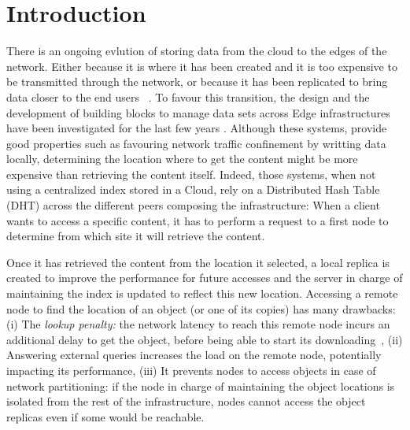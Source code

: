 
\section{Introduction}

There is an ongoing evlution of storing data from the cloud to the
edges of the network. Either because it is where it has been created
and it is too expensive to be transmitted through the network, or
because it has been replicated to bring data closer to the end users
~\cite{shi2016edge, foggy_cache, cachier}.
%
To favour this transition, the design and the development of building
blocks to manage data sets across Edge infrastructures have been
investigated for the last few years \cite{confais2017performance,
  confais2017object, fogstore, hasenburg2020towards}.  Although these systems,
provide good properties such as favouring network traffic confinement
by writting data locally, determining the location where to get the
content might be more expensive than retrieving the content itself.
%
Indeed, those systems, when not using a centralized index stored in a
Cloud, rely on a Distributed Hash Table (DHT) across the different
peers composing the infrastructure: When a client wants to access a
specific content, it has to perform a request to a first node to
determine from which site it will retrieve the content.

Once it has
retrieved the content from the location it selected, a local replica
is created to improve the performance for future accesses and the
server in charge of maintaining the index is updated to reflect this
new location.
%
Accessing a remote node to find the location of an object (or one of
its copies) has many drawbacks: (i) The \textit{lookup penalty:} the
network latency to reach this remote node incurs an additional delay
to get the object, before being able to start its
downloading~\cite{asrese2019measuring, doan2019tracing}, (ii)
Answering external queries increases the load on the remote node,
potentially impacting its performance, (iii) It prevents nodes to
access objects in case of network partitioning: if the node in charge
of maintaining the object locations is isolated from the rest of the
infrastructure, nodes cannot access the object replicas even if some
would be reachable.

